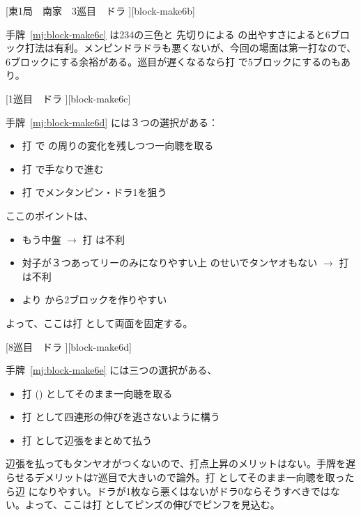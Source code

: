\documentclass[../nankiru_main.tex]{subfiles}
\begin{document}
[東1局　南家　3巡目　ドラ ][block-make6b]

手牌~\ref{mj:block-make6c} は234の三色と  先切りによる  の出やすさによると6ブロック打法は有利。メンピンドラドラも悪くないが、今回の場面は第一打なので、6ブロックにする余裕がある。巡目が遅くなるなら打  で5ブロックにするのもあり\citep[][pp.~42--43, p.~212]{fkt}。

[1巡目　ドラ ][block-make6c]

手牌~\ref{mj:block-make6d} には３つの選択がある：

\begin{itemize}
\item 打  で  の周りの変化を残しつつ一向聴を取る
\item 打  で手なりで進む
\item 打  でメンタンピン・ドラ1を狙う
\end{itemize}

ここのポイントは、

\begin{itemize}
\item もう中盤 $\to$ 打  は不利
\item 対子が３つあってリーのみになりやすい上  のせいでタンヤオもない $\to$ 打  は不利
\item {} より  から2ブロックを作りやすい
\end{itemize}

よって、ここは打  として両面を固定する\citep[][pp.~57--58]{fkt}。

[8巡目　ドラ ][block-make6d]

手牌~\ref{mj:block-make6e} には三つの選択がある、

\begin{itemize}
\item 打  () としてそのまま一向聴を取る
\item 打  として四連形の伸びを逃さないように構う
\item 打  として辺張をまとめて払う
\end{itemize}

辺張を払ってもタンヤオがつくないので、打点上昇のメリットはない。手牌を遅らせるデメリットは7巡目で大きいので論外。打  としてそのまま一向聴を取ったら辺  になりやすい。ドラが1枚なら悪くはないがドラ0ならそうすべきではない。よって、ここは打  としてピンズの伸びでピンフを見込む\citep[][p.~34]{uzaku-nankiru}。
\end{document}
